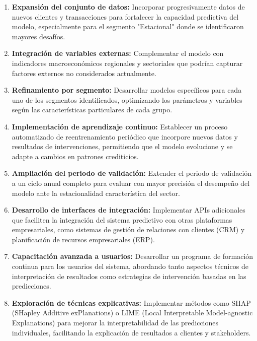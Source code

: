 \begin{enumerate}
    \item \textbf{Expansión del conjunto de datos:} Incorporar progresivamente datos de nuevos clientes y transacciones para fortalecer la capacidad predictiva del modelo, especialmente para el segmento "Estacional" donde se identificaron mayores desafíos.
    
    \item \textbf{Integración de variables externas:} Complementar el modelo con indicadores macroeconómicos regionales y sectoriales que podrían capturar factores externos no considerados actualmente.
    
    \item \textbf{Refinamiento por segmento:} Desarrollar modelos específicos para cada uno de los segmentos identificados, optimizando los parámetros y variables según las características particulares de cada grupo.
    
    \item \textbf{Implementación de aprendizaje continuo:} Establecer un proceso automatizado de reentrenamiento periódico que incorpore nuevos datos y resultados de intervenciones, permitiendo que el modelo evolucione y se adapte a cambios en patrones crediticios.
    
    \item \textbf{Ampliación del periodo de validación:} Extender el periodo de validación a un ciclo anual completo para evaluar con mayor precisión el desempeño del modelo ante la estacionalidad característica del sector.
    
    \item \textbf{Desarrollo de interfaces de integración:} Implementar APIs adicionales que faciliten la integración del sistema predictivo con otras plataformas empresariales, como sistemas de gestión de relaciones con clientes (CRM) y planificación de recursos empresariales (ERP).
    
    \item \textbf{Capacitación avanzada a usuarios:} Desarrollar un programa de formación continua para los usuarios del sistema, abordando tanto aspectos técnicos de interpretación de resultados como estrategias de intervención basadas en las predicciones.
    
    \item \textbf{Exploración de técnicas explicativas:} Implementar métodos como SHAP (SHapley Additive exPlanations) o LIME (Local Interpretable Model-agnostic Explanations) para mejorar la interpretabilidad de las predicciones individuales, facilitando la explicación de resultados a clientes y stakeholders.
    

\end{enumerate}
